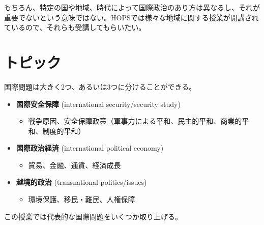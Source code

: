 \documentclass[
  xelatex,
  ja=standard]{bxjsarticle}
\providecommand{\tightlist}{%
  \setlength{\itemsep}{0pt}\setlength{\parskip}{0pt}}\usepackage{longtable,booktabs,array}
\begin{document}
\begin{tcolorbox}[enhanced jigsaw, colback=white, breakable, bottomtitle=1mm, toprule=.15mm, rightrule=.15mm, colframe=quarto-callout-warning-color-frame, opacityback=0, arc=.35mm, opacitybacktitle=0.6, bottomrule=.15mm, leftrule=.75mm, toptitle=1mm, coltitle=black, title=\textcolor{quarto-callout-warning-color}{\faExclamationTriangle}\hspace{0.5em}{地域研究や歴史研究}, titlerule=0mm, left=2mm, colbacktitle=quarto-callout-warning-color!10!white]

もちろん、特定の国や地域、時代によって国際政治のあり方は異なるし、それが重要でないという意味ではない。HOPSでは様々な地域に関する授業が開講されているので、それらも受講してもらいたい。

\end{tcolorbox}

\hypertarget{ux30c8ux30d4ux30c3ux30af}{%
\section{トピック}\label{ux30c8ux30d4ux30c3ux30af}}

国際問題は大きく2つ、あるいは3つに分けることができる。

\begin{itemize}
\tightlist
\item
  \textbf{国際安全保障} (international security/security study)

  \begin{itemize}
  \tightlist
  \item
    戦争原因、安全保障政策（軍事力による平和、民主的平和、商業的平和、制度的平和）
  \end{itemize}
\item
  \textbf{国際政治経済} (international political economy)

  \begin{itemize}
  \tightlist
  \item
    貿易、金融、通貨、経済成長
  \end{itemize}
\item
  \textbf{越境的政治} (transnational politics/issues)

  \begin{itemize}
  \tightlist
  \item
    環境保護、移民・難民、人権保障
  \end{itemize}
\end{itemize}

この授業では代表的な国際問題をいくつか取り上げる。
\end{document}
